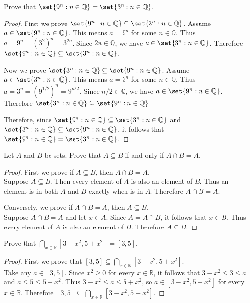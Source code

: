 \documentclass[DIN, pagenumber=false, fontsize=11pt, parskip=half]{scrartcl}
\begin{document}
\begin{problems}
    \problem Prove that $\set{9^n : n \in \mathbb{Q}} = \set{3^n : n \in \mathbb{Q}}$. 
    \begin{proof}
        First we prove $\set{9^n : n \in \mathbb{Q}} \subseteq \set{3^n : n \in \mathbb{Q}}$.
        Assume $a \in \set{9^n : n \in \mathbb{Q}}$.
        This means $a = 9^n$ for some $n \in \mathbb{Q}$.
        Thus $a = 9^n = (3^2)^n = 3^{2n}$.
        Since $2n \in \mathbb{Q}$, we have $a \in \set{3^n : n \in \mathbb{Q}}$.
        Therefore $\set{9^n : n \in \mathbb{Q}} \subseteq \set{3^n : n \in \mathbb{Q}}$.

        Now we prove $\set{3^n : n \in \mathbb{Q}} \subseteq \set{9^n : n \in \mathbb{Q}}$.
        Assume $a \in \set{3^n : n \in \mathbb{Q}}$.
        This means $a = 3^n$ for some $n \in \mathbb{Q}$.
        Thus $a = 3^n = (9^{1/2})^n = 9^{n/2}$.
        Since $n/2 \in \mathbb{Q}$, we have $a \in \set{9^n : n \in \mathbb{Q}}$.
        Therefore $\set{3^n : n \in \mathbb{Q}} \subseteq \set{9^n : n \in \mathbb{Q}}$.

        Therefore, since $\set{9^n : n \in \mathbb{Q}} \subseteq \set{3^n : n \in \mathbb{Q}}$ and $\set{3^n : n \in \mathbb{Q}} \subseteq \set{9^n : n \in \mathbb{Q}}$, it follows that $\set{9^n : n \in \mathbb{Q}} = \set{3^n : n \in \mathbb{Q}}$.
    \end{proof}

    \problem Let $A$ and $B$ be sets. Prove that $A \subseteq B$ if and only if $A \cap B = A$.
    \begin{proof}
        First we prove if $A \subseteq B$, then $A \cap B = A$.\\ 
        Suppose $A \subseteq B$. Then every element of $A$ is also an element of $B$. Thus an element is in both $A$ and $B$ exactly when is in $A$.
        Therefore $A \cap B = A$.

        Conversely, we prove if $A \cap B = A$, then $A \subseteq B$.\\ 
        Suppose $A \cap B = A$ and let $x \in A$.
        Since $A = A \cap B$, it follows that $x \in B$.
        Thus every element of $A$ is also an element of $B$.
        Therefore $A \subseteq B$.
    \end{proof} 

    \problem Prove that $\bigcap\limits_{x\in\mathbb{R}} [3-x^2, 5+x^2] = [3,5]$.
    \begin{proof}
        First we prove that $[3,5] \subseteq \bigcap\limits_{x\in\mathbb{R}}[3-x^2,5+x^2]$.\\ 
        Take any $a \in [3,5]$.
        Since $x^2 \geq 0$ for every $x \in \mathbb{R}$, it follows that $3-x^2 \leq 3 \leq a$ and $a \leq 5 \leq 5+x^2$.
        Thus $3-x^2 \leq a \leq 5+x^2$, so $a \in [3-x^2, 5+x^2]$ for every $x \in \mathbb{R}$.
        Therefore $[3,5] \subseteq \bigcap\limits_{x\in\mathbb{R}}[3-x^2,5+x^2]$.


\end{proof}
\end{problems}
\end{document}
